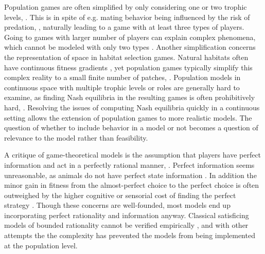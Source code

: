 Population games are often simplified by only considering  one or two trophic levels, \citep{cressman2010ideal, abrams2007role, sadowski2019predator}. This is in spite of e.g. mating behavior being influenced by the risk of predation, \citep{carranza1999red,lima2009predators}, naturally leading to a game with at least three types of players. Going to games with larger number of players can explain complex phenomena, which cannot be modeled with only two types \citep{pinti2019trophic}. Another simplification concerns the representation of space in habitat selection games.  Natural habitats often have continuous fitness gradients \citep{kawecki2004conceptual}, yet population games typically simplify this complex reality to a small finite number of patches, \cite{valdovinos2010consequences}. Population models in continuous space with multiple trophic levels or roles are generally hard to examine, as finding Nash equilibria in the resulting games is often prohibitively hard, \citep{empirical_trait,pinti2019trophic}. Resolving the issues of computing Nash equilibria quickly in a continuous setting allows the extension of population games to more realistic models. The question of whether to include behavior in a model or not becomes a question of relevance to the model rather than feasibility.


A critique of game-theoretical models is the assumption that players have perfect information and act in a perfectly rational manner, \citep{jones1999bounded}. Perfect information seems unreasonable, as animals do not have perfect state information \citep{simon1955behavioral}. In addition the minor gain in fitness from the almost-perfect choice to the perfect choice is often outweighed by the higher cognitive or sensorial cost of finding the perfect strategy \citep{simon1956rational, cohen2019bounded}. Though these concerns are well-founded, most models end up incorporating perfect rationality and information anyway. Classical satisficing models of bounded rationality cannot be verified empirically \citep{nonacs1993satisficing}, and with other attempts the \citep{bayesianmodel, thuijsman1995automata} the complexity has prevented the models from being implemented at the population level.



